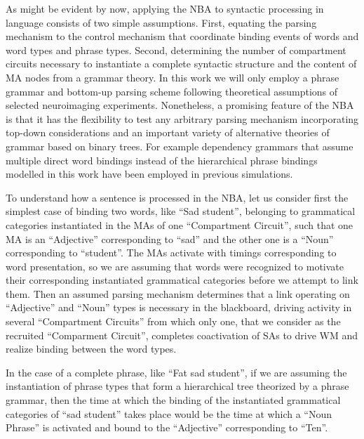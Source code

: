 \documentclass[10pt]{article}
\begin{document}
As might be evident by now, applying the NBA to syntactic processing in language consists of two simple assumptions.
First, equating the parsing mechanism to the control mechanism that coordinate binding events of words and word types and phrase types.
Second, determining the number of compartment circuits necessary to instantiate a complete syntactic structure and the content of MA nodes from a grammar theory.
In this work we will only employ a phrase grammar and bottom-up parsing scheme following theoretical assumptions of selected neuroimaging experiments.
Nonetheless, a promising feature of the NBA is that it has the flexibility to test any arbitrary parsing mechanism incorporating top-down considerations and an important variety of alternative theories of grammar based on binary trees.
For example dependency grammars that assume multiple direct word bindings instead of the hierarchical phrase bindings modelled in this work have been employed in previous simulations\cite{van_der_Velde_2010}.

To understand how a sentence is processed in the NBA, let us consider first the simplest case of binding two words, like ``Sad student'', 
belonging to grammatical categories instantiated in the MAs of one ``Compartment Circuit'', such that one MA is an ``Adjective'' corresponding to ``sad'' and the other one 
is a ``Noun'' corresponding to ``student''.
The MAs activate with timings corresponding to word presentation, so we are assuming that words were recognized to motivate their corresponding instantiated grammatical 
categories before we attempt to link them.
Then an assumed parsing mechanism determines that a link operating on ``Adjective'' and ``Noun'' types is necessary in the blackboard, driving activity in several 
``Compartment Circuits'' from which only one, that we consider as the recruited ``Comparment Circuit'', completes coactivation of SAs to drive WM and realize binding between the word types.

In the case of a complete phrase, like ``Fat sad student'', if we are assuming the instantiation of phrase types that form a hierarchical tree theorized by a phrase grammar, 
then the time at which the binding of the instantiated grammatical categories of ``sad student'' takes place would be the time at which a ``Noun Phrase'' is activated and bound 
to the ``Adjective'' corresponding to ``Ten''.
\end{document}
